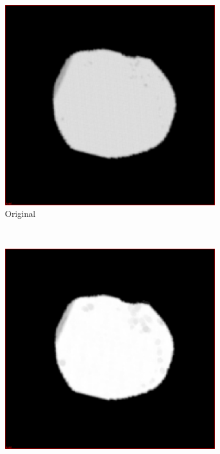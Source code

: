 \begin{figure}[h]
  \centering
  \begin{subfigure}[b]{0.3\textwidth}
    \includegraphics[width=\textwidth]{images/erosion_0.png}
    \caption{Original}
    \label{fig:erosion0}
  \end{subfigure}%
  ~ %
  \begin{subfigure}[b]{0.3\textwidth}
    \includegraphics[width=\textwidth]{images/erosion_1.png}

\end{subfigure}
\end{figure}
